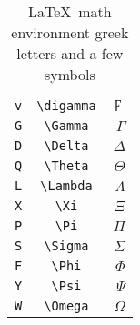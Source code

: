 \documentclass[a4paper,11pt]{scrartcl}
\numberwithin{equation}{section}
\begin{document}
\begin{table}[tb]
\begin{center}
\begin{tabular}{lcr}
    \verb|v|                     &    \verb|\digamma|                                             &    $\digamma$  \\
    \verb|G|                     &    \verb|\Gamma|                                               &    $\Gamma$  \\
    \verb|D|                     &    \verb|\Delta|                                               &    $\Delta$  \\
    \verb|Q|                     &    \verb|\Theta|                                               &    $\Theta$  \\
    \verb|L|                     &    \verb|\Lambda|                                              &    $\Lambda$  \\
    \verb|X|                     &    \verb|\Xi|                                                  &    $\Xi$  \\
    \verb|P|                     &    \verb|\Pi|                                                  &    $\Pi$  \\
    \verb|S|                     &    \verb|\Sigma|                                               &    $\Sigma$  \\
    \verb|F|                     &    \verb|\Phi|                                                 &    $\Phi$  \\
    \verb|Y|                     &    \verb|\Psi|                                                 &    $\Psi$  \\
    \verb|W|                     &    \verb|\Omega|                                               &    $\Omega$  \\
    \hline
    \end{tabular}
  \end{center}
  \caption{ \LaTeX \ math environment greek letters and a few symbols \smiley }
\end{table}
\end{document}
